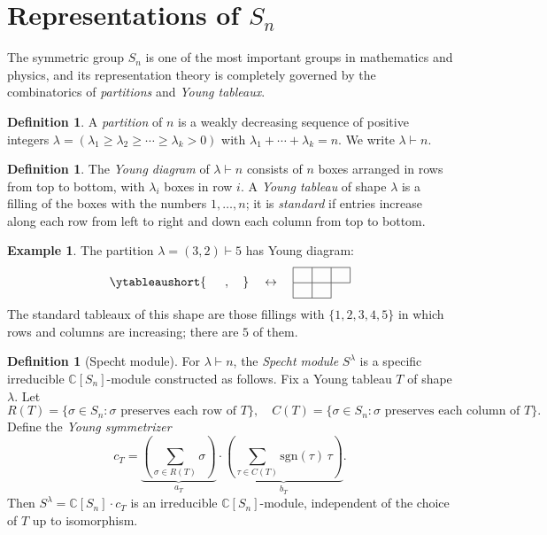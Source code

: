 \documentclass[12pt,a4paper]{amsart}
\theoremstyle{definition}
\newtheorem{definition}[theorem]{Definition}
\newtheorem{example}[theorem]{Example}
\begin{document}
\section{Representations of $S_n$}
\label{sec:sn}

The symmetric group $S_n$ is one of the most important groups in mathematics and
physics, and its representation theory is completely governed by the combinatorics
of \emph{partitions} and \emph{Young tableaux}.

\begin{definition}
A \emph{partition} of $n$ is a weakly decreasing sequence of positive integers
$\lambda = (\lambda_1 \geq \lambda_2 \geq \cdots \geq \lambda_k > 0)$ with
$\lambda_1 + \cdots + \lambda_k = n$.  We write $\lambda \vdash n$.
\end{definition}

\begin{definition}
The \emph{Young diagram} of $\lambda \vdash n$ consists of $n$ boxes arranged in
rows from top to bottom, with $\lambda_i$ boxes in row $i$.  A \emph{Young
tableau} of shape $\lambda$ is a filling of the boxes with the numbers $1,\ldots,n$;
it is \emph{standard} if entries increase along each row from left to right and
down each column from top to bottom.
\end{definition}

\begin{example}
The partition $\lambda = (3,2) \vdash 5$ has Young diagram:
\[
\ytableaushort{{\phantom{1}}{\phantom{1}}{\phantom{1}},{\phantom{1}}{\phantom{1}}}
\quad\leftrightarrow\quad
\begin{array}{|c|c|c|}
\hline
\phantom{1} & \phantom{1} & \phantom{1} \\
\hline
\phantom{1} & \phantom{1} \\
\cline{1-2}
\end{array}
\]
The standard tableaux of this shape are those fillings with $\{1,2,3,4,5\}$
in which rows and columns are increasing; there are $5$ of them.
\end{example}

\begin{definition}[Specht module]
For $\lambda \vdash n$, the \emph{Specht module} $S^\lambda$ is a specific
irreducible $\mathbb{C}[S_n]$-module constructed as follows.  Fix a Young tableau
$T$ of shape $\lambda$.  Let
\[
    R(T) = \{\sigma \in S_n : \sigma \text{ preserves each row of } T\},
\quad
    C(T) = \{\sigma \in S_n : \sigma \text{ preserves each column of } T\}.
\]
Define the \emph{Young symmetrizer}
\[
    c_T = \underbrace{\left(\sum_{\sigma \in R(T)} \sigma\right)}_{a_T} \cdot
          \underbrace{\left(\sum_{\tau \in C(T)} \mathrm{sgn}(\tau)\,\tau\right)}_{b_T}.
\]
Then $S^\lambda = \mathbb{C}[S_n] \cdot c_T$ is an irreducible $\mathbb{C}[S_n]$-module,
independent of the choice of $T$ up to isomorphism.
\end{definition}
\end{document}
